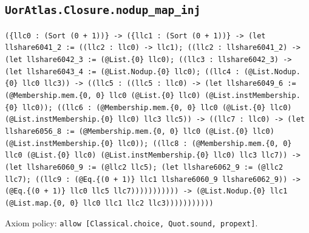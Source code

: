 \documentclass[11pt]{article}
\begin{document}
\subsection*{\texttt{UorAtlas.Closure.nodup\_map\_inj}}
\noindent\texttt{(\{llc0 : (Sort (0 + 1))\} -> (\{llc1 : (Sort (0 + 1))\} -> (let llshare6041\_2 := ((llc2 : llc0) -> llc1); ((llc2 : llshare6041\_2) -> (let llshare6042\_3 := (@List.\{0\} llc0); ((llc3 : llshare6042\_3) -> (let llshare6043\_4 := (@List.Nodup.\{0\} llc0); ((llc4 : (@List.Nodup.\{0\} llc0 llc3)) -> ((llc5 : ((llc5 : llc0) -> (let llshare6049\_6 := (@Membership.mem.\{0, 0\} llc0 (@List.\{0\} llc0) (@List.instMembership.\{0\} llc0)); ((llc6 : (@Membership.mem.\{0, 0\} llc0 (@List.\{0\} llc0) (@List.instMembership.\{0\} llc0) llc3 llc5)) -> ((llc7 : llc0) -> (let llshare6056\_8 := (@Membership.mem.\{0, 0\} llc0 (@List.\{0\} llc0) (@List.instMembership.\{0\} llc0)); ((llc8 : (@Membership.mem.\{0, 0\} llc0 (@List.\{0\} llc0) (@List.instMembership.\{0\} llc0) llc3 llc7)) -> (let llshare6060\_9 := (@llc2 llc5); (let llshare6062\_9 := (@llc2 llc7); ((llc9 : (@Eq.\{(0 + 1)\} llc1 llshare6060\_9 llshare6062\_9)) -> (@Eq.\{(0 + 1)\} llc0 llc5 llc7))))))))))) -> (@List.Nodup.\{0\} llc1 (@List.map.\{0, 0\} llc0 llc1 llc2 llc3)))))))))))}\par
\noindent Axiom policy: \texttt{allow [Classical.choice, Quot.sound, propext]}.\par
\end{document}
